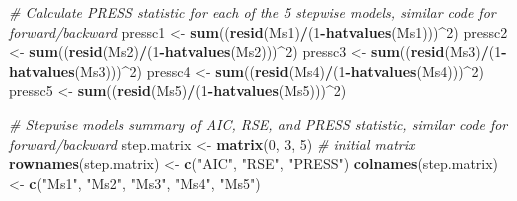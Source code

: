 \documentclass[]{article}
\newenvironment{Shaded}{\begin{snugshade}}{\end{snugshade}}
\newcommand{\KeywordTok}[1]{\textcolor[rgb]{0.13,0.29,0.53}{\textbf{#1}}}
\newcommand{\DecValTok}[1]{\textcolor[rgb]{0.00,0.00,0.81}{#1}}
\newcommand{\StringTok}[1]{\textcolor[rgb]{0.31,0.60,0.02}{#1}}
\newcommand{\CommentTok}[1]{\textcolor[rgb]{0.56,0.35,0.01}{\textit{#1}}}
\newcommand{\OperatorTok}[1]{\textcolor[rgb]{0.81,0.36,0.00}{\textbf{#1}}}
\newcommand{\NormalTok}[1]{#1}
\begin{document}
\begin{Shaded}
\begin{Highlighting}[]
\CommentTok{# Calculate PRESS statistic for each of the 5 stepwise models, similar code for forward/backward}
\NormalTok{pressc1 <-}\StringTok{ }\KeywordTok{sum}\NormalTok{((}\KeywordTok{resid}\NormalTok{(Ms1)}\OperatorTok{/}\NormalTok{(}\DecValTok{1}\OperatorTok{-}\KeywordTok{hatvalues}\NormalTok{(Ms1)))}\OperatorTok{^}\DecValTok{2}\NormalTok{)}
\NormalTok{pressc2 <-}\StringTok{ }\KeywordTok{sum}\NormalTok{((}\KeywordTok{resid}\NormalTok{(Ms2)}\OperatorTok{/}\NormalTok{(}\DecValTok{1}\OperatorTok{-}\KeywordTok{hatvalues}\NormalTok{(Ms2)))}\OperatorTok{^}\DecValTok{2}\NormalTok{)}
\NormalTok{pressc3 <-}\StringTok{ }\KeywordTok{sum}\NormalTok{((}\KeywordTok{resid}\NormalTok{(Ms3)}\OperatorTok{/}\NormalTok{(}\DecValTok{1}\OperatorTok{-}\KeywordTok{hatvalues}\NormalTok{(Ms3)))}\OperatorTok{^}\DecValTok{2}\NormalTok{)}
\NormalTok{pressc4 <-}\StringTok{ }\KeywordTok{sum}\NormalTok{((}\KeywordTok{resid}\NormalTok{(Ms4)}\OperatorTok{/}\NormalTok{(}\DecValTok{1}\OperatorTok{-}\KeywordTok{hatvalues}\NormalTok{(Ms4)))}\OperatorTok{^}\DecValTok{2}\NormalTok{)}
\NormalTok{pressc5 <-}\StringTok{ }\KeywordTok{sum}\NormalTok{((}\KeywordTok{resid}\NormalTok{(Ms5)}\OperatorTok{/}\NormalTok{(}\DecValTok{1}\OperatorTok{-}\KeywordTok{hatvalues}\NormalTok{(Ms5)))}\OperatorTok{^}\DecValTok{2}\NormalTok{)}


\CommentTok{# Stepwise models summary of AIC, RSE, and PRESS statistic, similar code for forward/backward}
\NormalTok{step.matrix <-}\StringTok{ }\KeywordTok{matrix}\NormalTok{(}\DecValTok{0}\NormalTok{, }\DecValTok{3}\NormalTok{, }\DecValTok{5}\NormalTok{) }\CommentTok{# initial matrix }
\KeywordTok{rownames}\NormalTok{(step.matrix) <-}\StringTok{ }\KeywordTok{c}\NormalTok{(}\StringTok{"AIC"}\NormalTok{, }\StringTok{"RSE"}\NormalTok{, }\StringTok{"PRESS"}\NormalTok{)}
\KeywordTok{colnames}\NormalTok{(step.matrix) <-}\StringTok{ }\KeywordTok{c}\NormalTok{(}\StringTok{"Ms1"}\NormalTok{, }\StringTok{"Ms2"}\NormalTok{, }\StringTok{"Ms3"}\NormalTok{, }\StringTok{"Ms4"}\NormalTok{, }\StringTok{"Ms5"}\NormalTok{)}


\end{Highlighting}
\end{Shaded}
\end{document}
